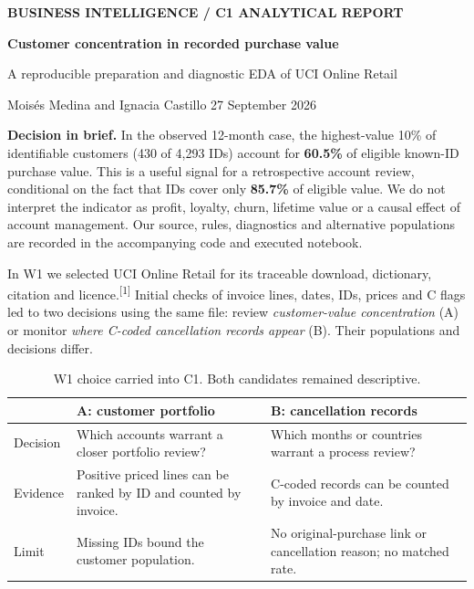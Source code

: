 \documentclass[10pt,a4paper]{article}
\newcommand{\sectionhead}[1]{\Needspace{8\baselineskip}\vspace{0.33em}{\large\bfseries\color{navy}#1}\par\vspace{0.08em}}
\newcommand{\source}[1]{\textsuperscript{[#1]}}
\begin{document}
\thispagestyle{empty}
{\small\bfseries\color{navy} BUSINESS INTELLIGENCE \hspace{0.7em} / \hspace{0.7em} C1 ANALYTICAL REPORT}\par
\vspace{0.6em}
{\LARGE\bfseries Customer concentration in recorded purchase value}\par
\vspace{0.3em}
{\large A reproducible preparation and diagnostic EDA of UCI Online Retail}\par
\vspace{0.55em}
{\color{muted} Mois\'{e}s Medina \quad and \quad Ignacia Castillo \hfill 27 September 2026}\par
{}\vspace{0.55em}

\textbf{Decision in brief.} In the observed 12-month case, the highest-value 10\% of identifiable customers (430 of 4,293 IDs) account for \textbf{60.5\%} of eligible known-ID purchase value. This is a useful signal for a retrospective account review, conditional on the fact that IDs cover only \textbf{85.7\%} of eligible value. We do not interpret the indicator as profit, loyalty, churn, lifetime value or a causal effect of account management. Our source, rules, diagnostics and alternative populations are recorded in the accompanying code and executed notebook.

\sectionhead{1\quad From W1 to C1: why this question}
In W1 we selected UCI Online Retail for its traceable download, dictionary, citation and licence.\source{1} Initial checks of invoice lines, dates, IDs, prices and C flags led to two decisions using the same file: review \emph{customer-value concentration} (A) or monitor \emph{where C-coded cancellation records appear} (B). Their populations and decisions differ.

\begin{table}[H]\centering\small
\caption{W1 choice carried into C1. Both candidates remained descriptive.}
\begin{tabularx}{\linewidth}{@{}p{1.75cm}XX@{}}\toprule
 & A: customer portfolio & B: cancellation records \\\midrule
Decision & Which accounts warrant a closer portfolio review? & Which months or countries warrant a process review? \\
Evidence & Positive priced lines can be ranked by ID and counted by invoice. & C-coded records can be counted by invoice and date. \\
Limit & Missing IDs bound the customer population. & No original-purchase link or cancellation reason; no matched rate. \\
\bottomrule\end{tabularx}
\end{table}
\end{document}
